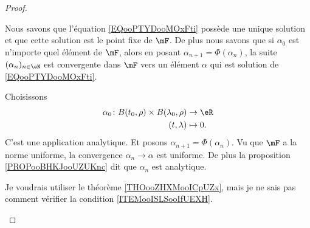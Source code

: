 \begin{proof}
\begin{subproof}
		Nous savons que l'équation \eqref{EQooPTYDooMOxFti} possède une unique solution et que cette solution est le point fixe de \( \mF\). De plus nous savons que si \( \alpha_0\) est n'importe quel élément de \( \mF\), alors en posant \( \alpha_{n+1}=\Phi(\alpha_n)\), la suite \( (\alpha_n)_{n\in \eN}\) est convergente dans \( \mF\) vers un élément \( \alpha\) qui est solution de \eqref{EQooPTYDooMOxFti}.

		Choisissons
		\begin{equation}
			\begin{aligned}
				\alpha_0\colon B(t_0,\rho)\times B(\lambda_0,\rho) & \to \eR    \\
				(t,\lambda)                                        & \mapsto 0.
			\end{aligned}
		\end{equation}
		C'est une application analytique. Et posons \( \alpha_{n+1}=\Phi(\alpha_n)\). Vu que \( \mF\) a la norme uniforme, la convergence \( \alpha_n\to \alpha\) est uniforme. De plus la proposition \ref{PROPooBHKJooUZUKnc} dit que \( \alpha_n\) est analytique.

		\begin{probleme}
			Je voudrais utiliser le théorème \ref{THOooZHXMooICpUZx}, mais je ne sais pas comment vérifier la condition \ref{ITEMooISLSooIfUEXH}.
		\end{probleme}
	\end{subproof}
\end{proof}

